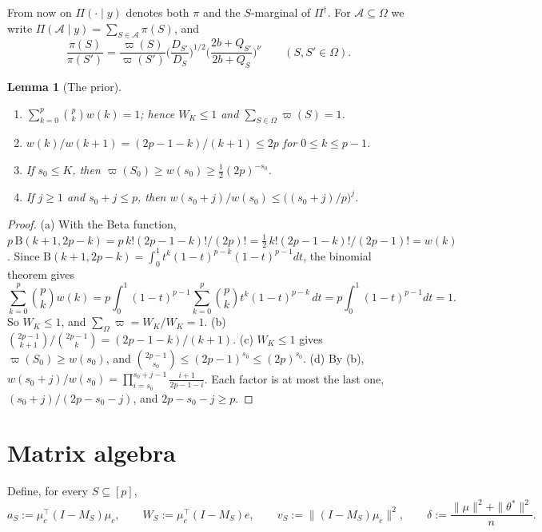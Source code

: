 \documentclass[11pt]{article}
\newtheorem{lemma}[theorem]{Lemma}
\theoremstyle{remark}
\newcommand{\Pd}{\Pi^\dagger}
\newcommand{\vp}{\varpi}
\begin{document}
From now on $\Pi(\cdot\mid y)$ denotes both $\pi$ and the $S$-marginal of $\Pd$. For $\mathcal A\subseteq\Omega$ we write $\Pi(\mathcal A\mid y)=\sum_{S\in\mathcal A}\pi(S)$, and
\begin{equation}\label{eq:ratio}
\frac{\pi(S)}{\pi(S')}=\frac{\vp(S)}{\vp(S')}\Big(\frac{D_{S'}}{D_S}\Big)^{1/2}\Big(\frac{2b+Q_{S'}}{2b+Q_S}\Big)^{\nu}\qquad(S,S'\in\Omega).
\end{equation}

\begin{lemma}[The prior]\label{lem:prior}
\begin{enumerate}[label=(\alph*)]
\item $\sum_{k=0}^p\binom pkw(k)=1$; hence $W_K\le1$ and $\sum_{S\in\Omega}\vp(S)=1$.
\item $w(k)/w(k+1)=(2p-1-k)/(k+1)\le 2p$ for $0\le k\le p-1$.
\item If $s_0\le K$, then $\vp(S_0)\ge w(s_0)\ge\frac12(2p)^{-s_0}$.
\item If $j\ge1$ and $s_0+j\le p$, then $w(s_0+j)/w(s_0)\le\big((s_0+j)/p\big)^j$.
\end{enumerate}
\end{lemma}

\begin{proof}
(a) With the Beta function, $p\,\mathrm B(k+1,2p-k)=p\,k!(2p-1-k)!/(2p)!=\frac12\,k!(2p-1-k)!/(2p-1)!=w(k)$. Since $\mathrm B(k+1,2p-k)=\int_0^1t^k(1-t)^{p-k}(1-t)^{p-1}dt$, the binomial theorem gives
\[
\sum_{k=0}^p\binom pkw(k)=p\int_0^1(1-t)^{p-1}\sum_{k=0}^p\binom pkt^k(1-t)^{p-k}\,dt=p\int_0^1(1-t)^{p-1}dt=1 .
\]
So $W_K\le1$, and $\sum_\Omega\vp=W_K/W_K=1$.
(b) $\binom{2p-1}{k+1}/\binom{2p-1}{k}=(2p-1-k)/(k+1)$.
(c) $W_K\le1$ gives $\vp(S_0)\ge w(s_0)$, and $\binom{2p-1}{s_0}\le(2p-1)^{s_0}\le(2p)^{s_0}$.
(d) By (b), $w(s_0+j)/w(s_0)=\prod_{i=s_0}^{s_0+j-1}\frac{i+1}{2p-1-i}$. Each factor is at most the last one, $(s_0+j)/(2p-s_0-j)$, and $2p-s_0-j\ge p$.
\end{proof}

\section{Matrix algebra}\label{sec:alg}

Define, for every $S\subseteq[p]$,
\[
a_S:=\mu_c^\top(I-M_S)\mu_c,\qquad W_S:=\mu_c^\top(I-M_S)e,\qquad v_S:=\|(I-M_S)\mu_c\|^2,\qquad \delta:=\frac{\|\mu\|^2+\|\theta^\ast\|^2}{n}.
\]
\end{document}
